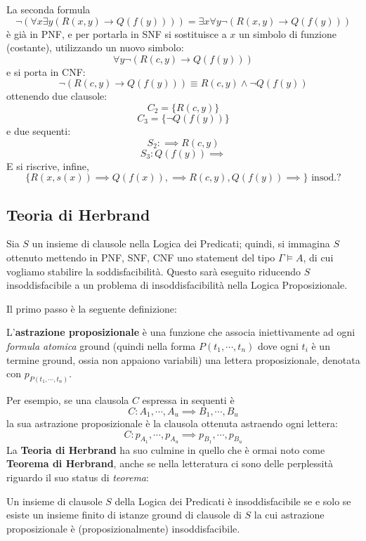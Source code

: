 La seconda formula 
$$
\neg (\forall x \exists y (R(x,y) \rightarrow Q(f(y)))) = \exists x \forall y \neg (R(x,y) \rightarrow Q(f(y)))
$$
è già in PNF, e per portarla in SNF si sostituisce a $x$ un simbolo di funzione
(costante), utilizzando un nuovo simbolo:
$$
\forall y \neg (R(c, y) \rightarrow Q(f(y)))
$$
e si porta in CNF: 
$$
\neg (R(c,y) \rightarrow Q(f(y))) \equiv R(c,y) \land \neg Q(f(y))
$$
ottenendo  due clausole: 
$$
C_2 = \{R(c,y)\}
$$
$$
C_3 = \{\neg Q(f(y))\}
$$
e due sequenti: 
$$
S_2 : \implies R(c,y)
$$
$$
S_3 : Q(f(y)) \implies
$$
E si riscrive, infine, 
$$
\{ R(x,s(x)) \implies Q(f(x)), \implies R(c,y), Q(f(y)) \implies\} \text{ insod.?}
$$
\subsection{Teoria di Herbrand}
Sia $S$ un insieme di clausole nella Logica dei Predicati; quindi, si immagina $S$ 
ottenuto mettendo in PNF, SNF, CNF uno statement del tipo $\Gamma \models A$, 
di cui vogliamo stabilire la soddisfacibilità. Questo sarà eseguito riducendo 
$S$ insoddisfacibile a un problema di insoddisfacibilità nella Logica Proposizionale.

Il primo passo è la seguente definizione: 
\begin{defi}
        L'\textbf{astrazione proposizionale} è una funzione che associa iniettivamente 
        ad ogni \textit{formula atomica} ground (quindi nella forma $P(t_1, \cdots, t_n)$
        dove ogni $t_i$ è un termine ground, ossia non appaiono variabili) una 
        lettera proposizionale, denotata con $p_{P(t_1, \cdots, t_n)}$. 
\end{defi}

Per esempio, se una clausola $C$ espressa in sequenti è 
$$
C: A_1, \cdots, A_u \implies B_1, \cdots, B_u
$$
la sua astrazione proposizionale è la clausola ottenuta astraendo ogni lettera: 
$$
C: p_{A_1}, \cdots, p_{A_u} \implies p_{B_1}, \cdots, p_{B_u}
$$
La \textbf{Teoria di Herbrand} ha suo culmine in quello che è ormai noto 
come \textbf{Teorema di Herbrand}, anche se nella letteratura ci sono delle 
perplessità riguardo il suo status di \textit{teorema}: 
\begin{teo}[di Herbrand]
        Un insieme di clausole $S$ della Logica dei Predicati è insoddisfacibile 
        se e solo se esiste un insieme finito di istanze ground di clausole 
        di $S$ la cui astrazione proposizionale è (proposizionalmente) insoddisfacibile.
\end{teo}


